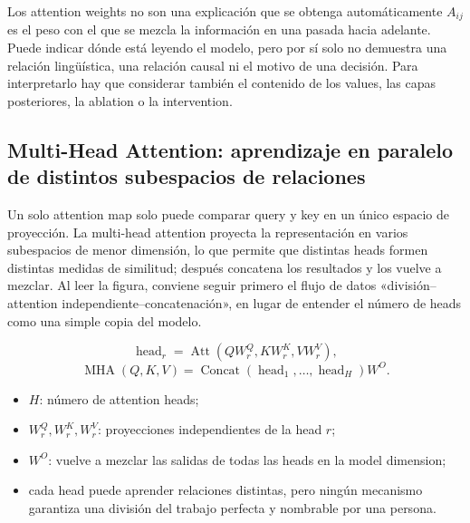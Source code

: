 \begin{warningbox}{Los attention weights no son una explicación que se obtenga automáticamente}
$A_{ij}$ es el peso con el que se mezcla la información en una pasada hacia adelante. Puede indicar dónde está leyendo el modelo, pero por sí solo no demuestra una relación lingüística, una relación causal ni el motivo de una decisión. Para interpretarlo hay que considerar también el contenido de los values, las capas posteriores, la ablation o la intervention.
\end{warningbox}

\subsection{Multi-Head Attention: aprendizaje en paralelo de distintos subespacios de relaciones}

Un solo attention map solo puede comparar query y key en un único espacio de proyección. La multi-head attention proyecta la representación en varios subespacios de menor dimensión, lo que permite que distintas heads formen distintas medidas de similitud; después concatena los resultados y los vuelve a mezclar. Al leer la figura, conviene seguir primero el flujo de datos «división--attention independiente--concatenación», en lugar de entender el número de heads como una simple copia del modelo.


\[
\operatorname{head}_r
=\operatorname{Att}\!\left(QW_r^Q,KW_r^K,VW_r^V\right),
\]
\[
\operatorname{MHA}(Q,K,V)
=\operatorname{Concat}(\operatorname{head}_1,\ldots,\operatorname{head}_H)W^O.
\]

\begin{itemize}
  \item $H$: número de attention heads;
  \item $W_r^Q,W_r^K,W_r^V$: proyecciones independientes de la head $r$;
  \item $W^O$: vuelve a mezclar las salidas de todas las heads en la model dimension;
  \item cada head puede aprender relaciones distintas, pero ningún mecanismo garantiza una división del trabajo perfecta y nombrable por una persona.
\end{itemize}


